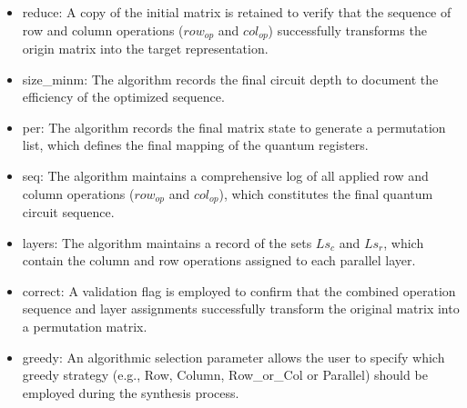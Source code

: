 \begin{itemize}
\item reduce: A copy of the initial matrix is retained to verify that the sequence of row and column operations ($row_{op}$ and $col_{op}$) successfully transforms the origin matrix into the target representation.
\item size\_minm: The algorithm records the final circuit depth to document the efficiency of the optimized sequence.
\item per: The algorithm records the final matrix state to generate a permutation list, which defines the final mapping of the quantum registers.
\item seq: The algorithm maintains a comprehensive log of all applied row and column operations ($row_{op}$ and $col_{op}$), which constitutes the final quantum circuit sequence.
\item layers: The algorithm maintains a record of the sets $Ls_{c}$ and $Ls_{r}$, which contain the column and row operations assigned to each parallel layer.
\item correct: A validation flag is employed to confirm that the combined operation sequence and layer assignments successfully transform the original matrix into a permutation matrix.
\item greedy: An algorithmic selection parameter allows the user to specify which greedy strategy (e.g., Row, Column, Row\_or\_Col or Parallel) should be employed during the synthesis process.
\end{itemize}